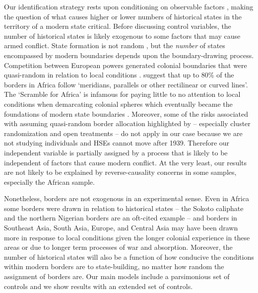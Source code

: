 Our identification strategy rests upon conditioning on observable factors
\citep{Morgan2015}, making the question of what causes higher or lower numbers
of historical states in the territory of a modern state critical. Before
discussing control variables, the number of historical states is likely
exogenous to some factors that may cause armed conflict. State formation is not
random \citep{Tilly1990, Osafo-Kwaako2013, Bates2008}, but the \emph{number} of
states encompassed by modern boundaries depends upon the boundary-drawing
process. 
Competition between European powers generated colonial boundaries that were
quasi-random in relation to local conditions \citep{Clapham1996, Branch2013,
McCauley2015}. \citet[3]{McCauley2015} suggest that up to 80\% of the borders in
Africa follow `meridians, parallels or other rectilinear or curved lines'. The
`Scramble for Africa' is infamous for paying little to no attention to local
conditions when demarcating colonial spheres which eventually became the
foundations of modern state boundaries \citep[32-34]{Michalopoulos2018}. 
Moreover, some of the risks associated with assuming quasi-random border
allocation highlighted by \citet{McCauley2015} -- especially cluster
randomization and open treatments -- do not apply in our case because we are not
studying individuals and HSEs cannot move after 1939. Therefore our independent
variable is partially assigned by a process that is likely to be independent of
factors that cause modern conflict. At the very least, our results are not
likely to be explained by reverse-causality concerns in some samples, especially
the African sample.  
    
Nonetheless, borders are not exogenous in an experimental sense. Even in Africa
some borders were drawn in relation to historical states -- the Sokoto caliphate
and the northern Nigerian borders are an oft-cited example \citep{McCauley2015}
-- and borders in Southeast Asia, South Asia, Europe, and Central Asia may have
been drawn more in response to local conditions given the longer colonial
experience in these areas or due to longer term processes of war and absorption.
Moreover, the number of historical states will also be a function of how
conducive the conditions within modern borders are to state-building, no matter
how random the assignment of borders are. Our main models include a parsimonious
set of controls and we show results with an extended set of controls.

